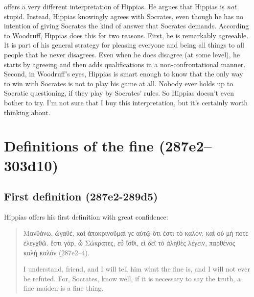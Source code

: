 \documentclass[11pt]{article}
\begin{document}
\citet{woodruff1982} offers a very different interpretation of Hippias.  He
argues that Hippias is \emph{not} stupid.  Instead, Hippias knowingly
agrees with Socrates, even though he has no intention of giving Socrates
the kind of answer that Socrates demands.  According to Woodruff, Hippias
does this for two reasons.  First, he is remarkably agreeable.  It is part
of his general strategy for pleasing everyone and being all things to all
people that he never disagrees.  Even when he does disagree (at some
level), he starts by agreeing and then adds qualifications in
a non-confrontational manner.  Second, in Woodruff's eyes, Hippias is smart
enough to know that the only way to win with Socrates is not to play his
game at all.  Nobody ever holds up to Socratic questioning, if they play by
Socrates' rules.  So Hippias doesn't even bother to try.  I'm not sure that
I buy this interpretation, but it's certainly worth thinking about.



\section{Definitions of the fine (287e2--303d10)}

\subsection{First definition (287e2-289d5)}

Hippias offers his first definition with great confidence:

\begin{quote}

    {\g
    Μανθάνω, ὠγαθέ, καὶ ἀποκρινοῦμαί γε αὐτῷ ὅτι ἐστι τὸ καλόν, καὶ οὐ μή
    ποτε ἐλεγχθῶ. ἔστι γάρ, ὦ Σώκρατες, εὖ ἴσθι, εἰ δεῖ τὸ ἀληθὲς λέγειν,
    παρθένος καλὴ καλόν
    } (287e2--4).

    I understand, friend, and I will tell him what the fine is, and I will
    not ever be refuted.  For, Socrates, know well, if it is necessary to
    say the truth, a fine maiden is a fine thing.

\end{quote}
\end{document}
